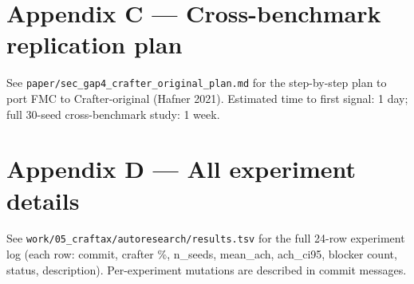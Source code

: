 \section{Appendix C — Cross-benchmark replication plan}

See \texttt{paper/sec\_gap4\_crafter\_original\_plan.md} for the step-by-step plan
to port FMC to Crafter-original (Hafner 2021). Estimated time to first
signal: 1 day; full 30-seed cross-benchmark study: 1 week.

\section{Appendix D — All experiment details}

See \texttt{work/05\_craftax/autoresearch/results.tsv} for the full 24-row
experiment log (each row: commit, crafter \%, n\_seeds, mean\_ach,
ach\_ci95, blocker count, status, description). Per-experiment
mutations are described in commit messages.

